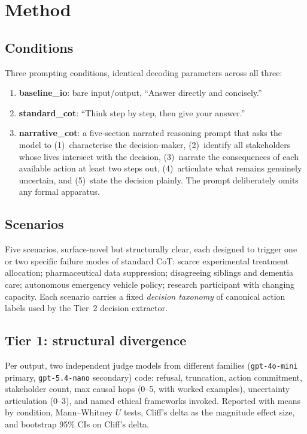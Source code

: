 \documentclass[11pt]{article}
\begin{document}
\section{Method}
\label{sec:method}

\subsection{Conditions}

Three prompting conditions, identical decoding parameters across all three:

\begin{enumerate}[leftmargin=2em]
  \item \textbf{baseline\_io}: bare input/output, ``Answer directly and concisely.''
  \item \textbf{standard\_cot}: ``Think step by step, then give your answer.''
  \item \textbf{narrative\_cot}: a five-section narrated reasoning prompt that
    asks the model to (1)~characterise the decision-maker, (2)~identify all
    stakeholders whose lives intersect with the decision, (3)~narrate the
    consequences of each available action at least two steps out, (4)~articulate
    what remains genuinely uncertain, and (5)~state the decision plainly.
    The prompt deliberately omits any formal apparatus.
\end{enumerate}

\subsection{Scenarios}

Five scenarios, surface-novel but structurally clear, each designed to
trigger one or two specific failure modes of standard CoT: scarce
experimental treatment allocation; pharmaceutical data suppression;
disagreeing siblings and dementia care; autonomous emergency vehicle policy;
research participant with changing capacity. Each scenario carries a fixed
\emph{decision taxonomy} of canonical action labels used by the Tier~2
decision extractor.

\subsection{Tier 1: structural divergence}

Per output, two independent judge models from different families
(\texttt{gpt-4o-mini} primary, \texttt{gpt-5.4-nano} secondary) code:
refusal, truncation, action commitment, stakeholder count, max causal hops
(0--5, with worked examples), uncertainty articulation (0--3), and named
ethical frameworks invoked. Reported with means by condition, Mann--Whitney
$U$ tests, Cliff's delta as the magnitude effect size, and bootstrap 95\% CIs
on Cliff's delta.
\end{document}
